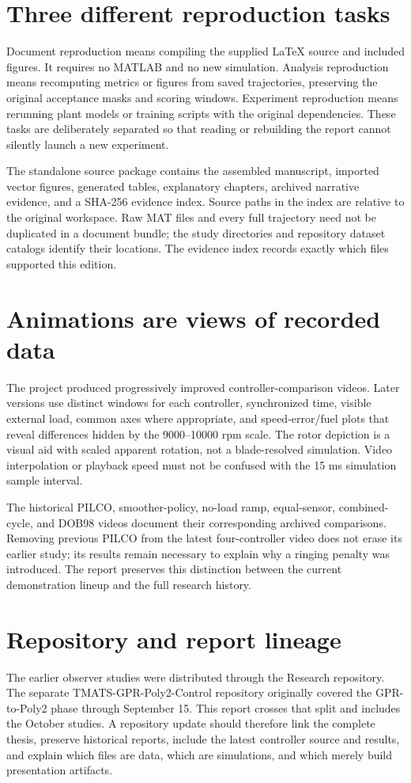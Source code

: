\section{Three different reproduction tasks}
Document reproduction means compiling the supplied LaTeX source and included figures. It requires no MATLAB and no new simulation. Analysis reproduction means recomputing metrics or figures from saved trajectories, preserving the original acceptance masks and scoring windows. Experiment reproduction means rerunning plant models or training scripts with the original dependencies. These tasks are deliberately separated so that reading or rebuilding the report cannot silently launch a new experiment.

The standalone source package contains the assembled manuscript, imported vector figures, generated tables, explanatory chapters, archived narrative evidence, and a SHA-256 evidence index. Source paths in the index are relative to the original workspace. Raw MAT files and every full trajectory need not be duplicated in a document bundle; the study directories and repository dataset catalogs identify their locations. The evidence index records exactly which files supported this edition.

\section{Animations are views of recorded data}
The project produced progressively improved controller-comparison videos. Later versions use distinct windows for each controller, synchronized time, visible external load, common axes where appropriate, and speed-error/fuel plots that reveal differences hidden by the 9000--10000 rpm scale. The rotor depiction is a visual aid with scaled apparent rotation, not a blade-resolved simulation. Video interpolation or playback speed must not be confused with the 15 ms simulation sample interval.

The historical PILCO, smoother-policy, no-load ramp, equal-sensor, combined-cycle, and DOB98 videos document their corresponding archived comparisons. Removing previous PILCO from the latest four-controller video does not erase its earlier study; its results remain necessary to explain why a ringing penalty was introduced. The report preserves this distinction between the current demonstration lineup and the full research history.

\section{Repository and report lineage}
The earlier observer studies were distributed through the Research repository. The separate TMATS-GPR-Poly2-Control repository originally covered the GPR-to-Poly2 phase through September 15. This report crosses that split and includes the October studies. A repository update should therefore link the complete thesis, preserve historical reports, include the latest controller source and results, and explain which files are data, which are simulations, and which merely build presentation artifacts.

